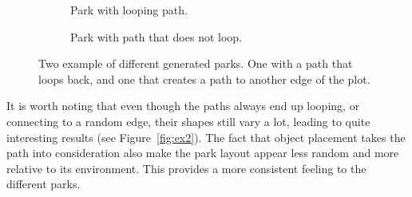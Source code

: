 \begin{figure}[H]
   \centering
   \begin{subfigure}[b]{0.4\textwidth}
     \caption{Park with looping path.}
   \end{subfigure}
   \quad
   \begin{subfigure}[b]{0.4\textwidth}
     \caption{Park with path that does not loop.}
   \end{subfigure}
   \caption{Two example of different generated parks. One with a path that loops back, and one that creates a path to another edge of the plot.}
   \label{fig:parks}
 \end{figure}
 
 It is worth noting that even though the paths always end up looping, or connecting to a random edge, their shapes still vary a lot, leading to quite interesting results (see Figure~\ref{fig:ex2}).
 The fact that object placement takes the path into consideration also make the park layout appear less random and more relative to its environment. 
 This provides a more consistent feeling to the different parks.
 

